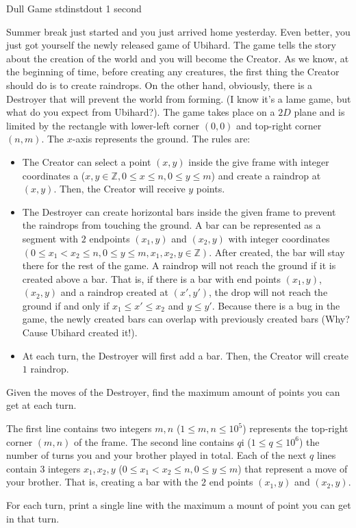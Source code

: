 \begin{problem}{Dull Game}
{stdin}{stdout}
{1 second}{}{}

Summer break just started and you just arrived home yesterday. Even better, you just got yourself the newly released game of Ubihard. The game tells the story about the creation of the world and you will become the Creator. As we know, at the beginning of time, before creating any creatures, the first thing the Creator should do is to create raindrops. On the other hand, obviously, there is a Destroyer that will prevent the world from forming. (I know it's a lame game, but what do you expect from Ubihard?). The game takes place on a $2D$ plane and is limited by the rectangle with lower-left corner $(0, 0)$ and top-right corner $(n, m)$. The $x$-axis represents the ground. The rules are:
	\begin{itemize}
		\item
		The Creator can select a point $(x, y)$ inside the give frame with integer coordinates a ($x, y \in \mathbb{Z}, 0 \leq x \leq n, 0 \leq y \leq m$) and create a raindrop at $(x, y)$. Then, the Creator will receive $y$ points.
		\item
		The Destroyer can create horizontal bars inside the given frame to prevent the raindrops from touching the ground. A bar can be represented as a segment with $2$ endpoints $(x_1, y)$ and $(x_2, y)$ with integer coordinates $(0 \leq x_1 < x_2 \leq n, 0 \leq y \leq m, x_1, x_2, y \in \mathbb{Z})$. After created, the bar will stay there for the rest of the game. A raindrop will not reach the ground if it is created above a bar. That is, if there is a bar with end points $(x_1, y)$, $(x_2, y)$ and a raindrop created at $(x', y')$, the drop will not reach the ground if and only if $x_1 \leq x' \leq x_2$ and $y \leq y'$. Because there is a bug in the game, the newly created bars can overlap with previously created bars (Why? Cause Ubihard created it!).
		\item
		At each turn, the Destroyer will first add a bar. Then, the Creator will create $1$ raindrop.
	\end{itemize}

\noindent Given the moves of the Destroyer, find the maximum amount of points you can get at each turn.

\InputFile

The first line contains two integers $m, n$ ($1 \leq m, n \leq 10^5$) represents the top-right corner $(m, n)$ of the frame. The second line contains $q$i ($1 \leq q \leq 10^6$) the number of turns you and your brother played in total. Each of the next $q$ lines contain $3$ integers $x_1, x_2, y$ ($0 \leq x_1 < x_2 \leq n, 0 \leq y \leq m$) that represent a move of your brother. That is, creating a bar with the $2$ end points $(x_1, y)$ and $(x_2, y)$.

\OutputFile

For each turn, print a single line with the maximum a mount of point you can get in that turn.

\Examples

\begin{example}
%
\end{example}

\end{problem}
